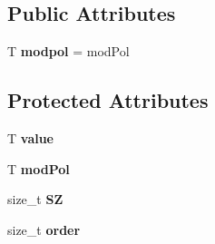 \subsection*{Public Attributes}
\begin{DoxyCompactItemize}
\item 
\mbox{\label{class_g_flinalg_1_1_basic_g_f_elem_a4e8bed65d8bc3e75976ce06e9bcd0b25}} 
T {\bfseries modpol} = mod\+Pol
\end{DoxyCompactItemize}
\subsection*{Protected Attributes}
\begin{DoxyCompactItemize}
\item 
\mbox{\label{class_g_flinalg_1_1_basic_g_f_elem_a68da5d564a1a1c9881b798bf37fce1d0}} 
T {\bfseries value}
\item 
\mbox{\label{class_g_flinalg_1_1_basic_g_f_elem_a4792dd3acb6f3a7ac02e6e86fca98844}} 
T {\bfseries mod\+Pol}
\item 
\mbox{\label{class_g_flinalg_1_1_basic_g_f_elem_ad4ace9a962c8cc9b1d4ef37e7bf2d13f}} 
size\+\_\+t {\bfseries SZ}
\item 
\mbox{\label{class_g_flinalg_1_1_basic_g_f_elem_ad192149e0f410d6549be607032a31b64}} 
size\+\_\+t {\bfseries order}
\end{DoxyCompactItemize}
